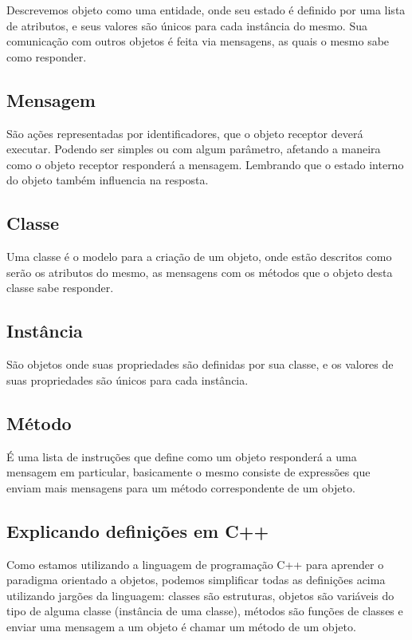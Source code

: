 \documentclass[a4paper, 12pt]{article}
\begin{document}
		Descrevemos objeto como uma entidade, onde seu estado é definido por uma lista de atributos, e seus valores são únicos para cada instância do mesmo. Sua comunicação com outros objetos é feita via mensagens, as quais o mesmo sabe como responder.
		
		\subsection{Mensagem}
		
		São ações representadas por identificadores, que o objeto receptor deverá executar. Podendo ser simples ou com algum parâmetro, afetando a maneira como o objeto receptor responderá a mensagem. Lembrando que o estado interno do objeto também influencia na resposta. 
		
		\subsection{Classe}
		
		Uma classe é o modelo para a criação de um objeto, onde estão descritos como serão os atributos do mesmo, as mensagens com os métodos que o objeto desta classe sabe responder.
		
		\subsection{Instância}
		
		São objetos onde suas propriedades são definidas por sua classe, e os valores de suas propriedades são únicos para cada instância.
		
		\subsection{Método}
		
		É uma lista de instruções que define como um objeto responderá a uma mensagem em particular, basicamente o mesmo consiste de expressões que enviam mais mensagens para um método correspondente de um objeto.
		
		\subsection{Explicando definições em C++}
		
		Como estamos utilizando a linguagem de programação C++ para aprender o paradigma orientado a objetos, podemos simplificar todas as definições acima utilizando jargões da linguagem: classes são estruturas, objetos são variáveis do tipo de alguma classe (instância de uma classe), métodos são funções de classes e enviar uma mensagem a um objeto é chamar um método de um objeto.
	
		
		
\end{document}

